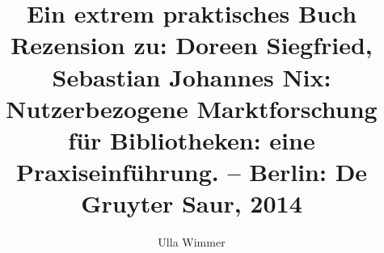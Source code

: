 
\fancyhead[R]{\thepage} %

\title{\LARGE{Ein extrem praktisches Buch} \\ \large{Rezension zu: 
Doreen Siegfried, Sebastian Johannes Nix: Nutzerbezogene Marktforschung für Bibliotheken: eine Praxiseinführung. – Berlin: De Gruyter Saur, 2014
}} %
\author{Ulla Wimmer} %